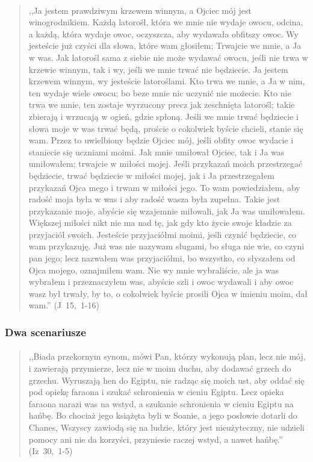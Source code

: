 \documentclass[10pt,a4paper,oneside]{article}
\begin{document}
\paragraph{}
\begin{quote}
,,Ja jestem prawdziwym krzewem winnym, a Ojciec mój jest winogrodnikiem. Każdą latorośl, która we mnie nie wydaje owocu, odcina, a każdą, która wydaje owoc, oczyszcza, aby wydawała obfitszy owoc. Wy jesteście już czyści dla słowa, które wam głosiłem; Trwajcie we mnie, a Ja w was. Jak latorośl sama z siebie nie może wydawać owocu, jeśli nie trwa w krzewie winnym, tak i wy, jeśli we mnie trwać nie będziecie. Ja jestem krzewem winnym, wy jesteście latoroślami. Kto trwa we mnie, a Ja w nim, ten wydaje wiele owocu; bo beze mnie nic uczynić nie możecie. Kto nie trwa we mnie, ten zostaje wyrzucony precz jak zeschnięta latorośl; takie zbierają i wrzucają w ogień, gdzie spłoną. Jeśli we mnie trwać będziecie i słowa moje w was trwać będą, proście o cokolwiek byście chcieli, stanie się wam. Przez to uwielbiony będzie Ojciec mój, jeśli obfity owoc wydacie i staniecie się uczniami moimi. Jak mnie umiłował Ojciec, tak i Ja was umiłowałem; trwajcie w miłości mojej. Jeśli przykazań moich przestrzegać będziecie, trwać będziecie w miłości mojej, jak i Ja przestrzegałem przykazań Ojca mego i trwam w miłości jego. To wam powiedziałem, aby radość moja była w was i aby radość wasza była zupełna. Takie jest przykazanie moje, abyście się wzajemnie miłowali, jak Ja was umiłowałem. Większej miłości nikt nie ma nad tę, jak gdy kto życie swoje kładzie za przyjaciół swoich. Jesteście przyjaciółmi moimi, jeśli czynić będziecie, co wam przykazuję. Już was nie nazywam sługami, bo sługa nie wie, co czyni pan jego; lecz nazwałem was przyjaciółmi, bo wszystko, co słyszałem od Ojca mojego, oznajmiłem wam. Nie wy mnie wybraliście, ale ja was wybrałem i przeznaczyłem was, abyście szli i owoc wydawali i aby owoc wasz był trwały, by to, o cokolwiek byście prosili Ojca w imieniu moim, dał wam.'' \mbox{(J 15, 1-16)}
\end{quote}
\subsubsection{Dwa scenariusze}
\paragraph{}
\begin{quote}
,,Biada przekornym synom, mówi Pan, którzy wykonują plan, lecz nie mój, i zawierają przymierze, lecz nie w moim duchu, aby dodawać grzech do grzechu. Wyruszają hen do Egiptu, nie radząc się moich ust, aby oddać się pod opiekę faraona i szukać schronienia w cieniu Egiptu. Lecz opieka faraona narazi was na wstyd, a szukanie schronienia w cieniu Egiptu na hańbę. Bo chociaż jego książęta byli w Soanie, a jego posłowie dotarli do Chanes, Wszyscy zawiodą się na ludzie, który jest nieużyteczny, nie udzieli pomocy ani nie da korzyści, przyniesie raczej wstyd, a nawet hańbę.'' \mbox{(Iz 30, 1-5)}
\end{quote}
\end{document}
